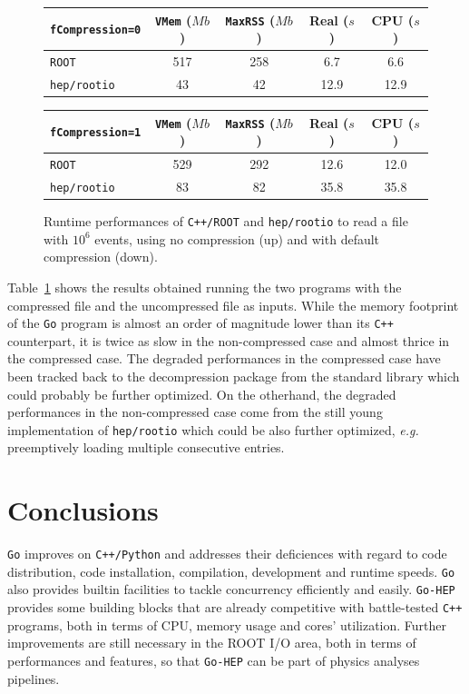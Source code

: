 \documentclass[a4paper]{jpconf}
\begin{document}
\begin{figure}[h]
\begin{center}
  \begin{tabular}{ l | c | c | c | c }
	  \texttt{fCompression=0} & \texttt{VMem} ($Mb$) & \texttt{MaxRSS} ($Mb$) & Real ($s$) & CPU ($s$) \\
    \hline
	   \texttt{ROOT} & 517 & 258 & 6.7 & 6.6 \\
	   \texttt{hep/rootio} & 43 & 42 & 12.9 & 12.9 \\
    \hline
  \end{tabular}
\end{center}

\begin{center}
  \begin{tabular}{ l | c | c | c | c }
	  \texttt{fCompression=1} & \texttt{VMem} ($Mb$) & \texttt{MaxRSS} ($Mb$) & Real ($s$) & CPU ($s$) \\
    \hline
	   \texttt{ROOT} & 529 & 292 & 12.6 & 12.0 \\
	   \texttt{hep/rootio} & 83 & 82 & 35.8 & 35.8 \\
    \hline
  \end{tabular}
	\caption{\label{fig-rootio-perf-tab}Runtime performances of \texttt{C++/ROOT} and \texttt{hep/rootio} to read a file with $10^6$ events, using no compression (up) and with default compression (down).}
\end{center}
\end{figure}

Table~\ref{fig-rootio-perf-tab} shows the results obtained running the two programs with the compressed file and the uncompressed file as inputs.
While the memory footprint of the \texttt{Go} program is almost an order of magnitude lower than its \texttt{C++} counterpart, it is twice as slow in the non-compressed case and almost thrice in the compressed case.
The degraded performances in the compressed case have been tracked back to the decompression package from the standard library which could probably be further optimized.
On the otherhand, the degraded performances in the non-compressed case come from the still young implementation of \texttt{hep/rootio} which could be also further optimized, \emph{e.g.} preemptively loading multiple consecutive entries.

\section{Conclusions}

\texttt{Go} improves on \texttt{C++/Python} and addresses their deficiences with regard to code distribution, code installation, compilation, development and runtime speeds.
\texttt{Go} also provides builtin facilities to tackle concurrency efficiently and easily.
\texttt{Go-HEP} provides some building blocks that are already competitive with battle-tested \texttt{C++} programs, both in terms of CPU, memory usage and cores' utilization.
Further improvements are still necessary in the ROOT I/O area, both in terms of performances and features, so that \texttt{Go-HEP} can be part of physics analyses pipelines.
\end{document}
